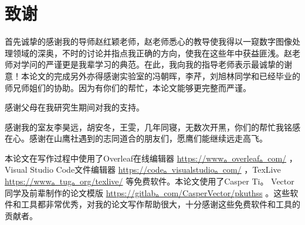 
\chapter{致谢}
首先诚挚的感谢我的导师赵红颖老师，赵老师悉心的教导使我得以一窥数字图像处理领域的深奥，不时的讨论并指点我正确的方向，使我在这些年中获益匪浅。赵老师对学问的严谨更是我辈学习的典范。在此，我向我的指导老师表示最诚挚的谢意！本论文的完成另外亦得感谢实验室的冯朝晖，李芹，刘旭林同学和已经毕业的师兄师姐们的协助。因为有你们的帮忙，本论文能够更完整而严谨。
\par
感谢父母在我研究生期间对我的支持。
\par
感谢我的室友李昊远，胡安冬，王雯，几年同寝，无数次开黑，你们的帮忙我铭感在心。感谢在山鹰社遇到的志同道合的朋友们，愿鹰们能继续远走高飞。
\par
本论文在写作过程中使用了Overleaf在线编辑器 \url{https://www。overleaf。com/} ，Visual Studio Code文件编辑器 \url{https://code。visualstudio。com/} ，TexLive \url{https://www。tug。org/texlive/} 等免费软件。本论文使用了Casper Ti。 Vector同学及前辈制作的论文模版 \url{https://gitlab。com/CasperVector/pkuthss} 。这些软件和工具都非常优秀，对我的论文写作帮助很大，十分感谢这些免费软件和工具的贡献者。

